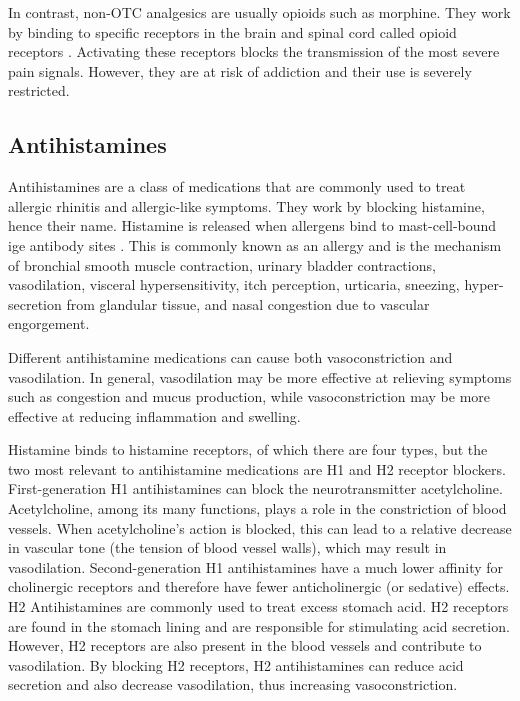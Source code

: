 In contrast, non-OTC analgesics are usually opioids such as morphine. They work by binding to specific receptors in the brain and spinal cord called opioid receptors \cite{Schulz2004}. Activating these receptors blocks the transmission of the most severe pain signals. However, they are at risk of addiction and their use is severely restricted.

\subsection{Antihistamines}

Antihistamines are a class of medications that are commonly used to treat allergic rhinitis and allergic-like symptoms. They work by blocking histamine, hence their name. Histamine is released when allergens bind to mast-cell-bound \gls{ige} antibody sites \cite{Vardanyan2016}. This is commonly known as an allergy and is the mechanism of bronchial smooth muscle contraction, urinary bladder contractions, vasodilation, visceral hypersensitivity, itch perception, urticaria, sneezing, hyper-secretion from glandular tissue, and  nasal congestion due to vascular engorgement.


Different antihistamine medications can cause both vasoconstriction and vasodilation. In general, vasodilation may be more effective at relieving symptoms such as congestion and mucus production, while vasoconstriction may be more effective at reducing inflammation and swelling.

Histamine binds to histamine receptors, of which there are four types, but the two most relevant to antihistamine medications are H1 and H2 receptor blockers. First-generation H1 antihistamines can block the neurotransmitter acetylcholine. Acetylcholine, among its many functions, plays a role in the constriction of blood vessels. When acetylcholine's action is blocked, this can lead to a relative decrease in vascular tone (the tension of blood vessel walls), which may result in vasodilation. Second-generation H1 antihistamines have a much lower affinity for cholinergic receptors and therefore have fewer anticholinergic (or sedative) effects. H2 Antihistamines are commonly used to treat excess stomach acid. H2 receptors are found in the stomach lining and are responsible for stimulating acid secretion. However, H2 receptors are also present in the blood vessels and contribute to vasodilation. By blocking H2 receptors, H2 antihistamines can reduce acid secretion and also decrease vasodilation, thus increasing vasoconstriction.

